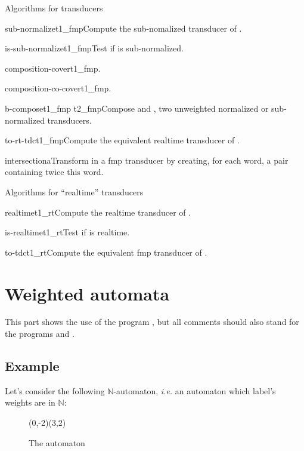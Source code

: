 \begin{fnsection}{Algorithms for transducers}
\item{sub-normalize}{t1\_fmp}{Compute the sub-nomalized transducer of
    .}
\item{is-sub-normalize}{t1\_fmp}{Test if  is
    sub-normalized.}
\item{composition-cover}{t1\_fmp}{.}%
\item{composition-co-cover}{t1\_fmp}{.}%
\item{b-compose}{t1\_fmp t2\_fmp}{Compose  and
    , two unweighted normalized or sub-normalized
    transducers.}
\item{to-rt-tdc}{t1\_fmp}{Compute the equivalent realtime transducer
    of .}
\item{intersection}{a}{Transform  in a fmp transducer by
    creating, for each word, a pair containing twice this word.}
  \hline
\end{fnsection}


\begin{fnsection}{Algorithms for ``realtime'' transducers}
\item{realtime}{t1\_rt}{Compute the realtime transducer of  .}
\item{is-realtime}{t1\_rt}{Test if  is realtime.}
\item{to-tdc}{t1\_rt}{Compute the equivalent fmp transducer of .}
\hline
\end{fnsection}

\newpage
\section{Weighted automata}

This part shows the use of the program , but
all comments should also stand for the programs
 and .

\subsection{Example}

Let's consider the following $\mathbb{N}$-automaton, \textit{i.e.}
an automaton which label's weights are in $\mathbb{N}$:

\begin{figure}[ht] \centering
  \begin{VCPicture}{(0,-2)(3,2)}
     
     
     
     
  \end{VCPicture}
  \caption{The automaton }
\end{figure}

